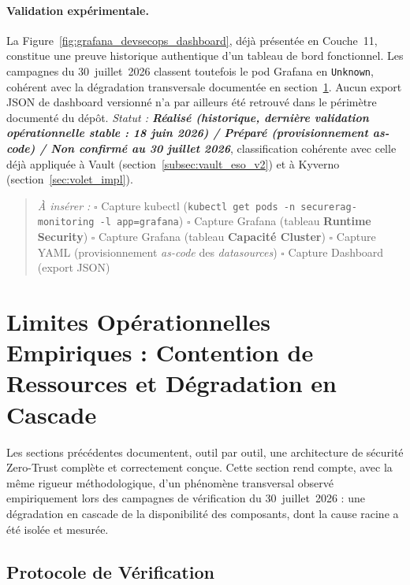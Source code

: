 \paragraph{Validation expérimentale.}
La Figure~\ref{fig:grafana_devsecops_dashboard}, déjà présentée en Couche~11, constitue une preuve historique authentique d'un tableau de bord fonctionnel. Les campagnes du 30~juillet~2026 classent toutefois le pod Grafana en \texttt{Unknown}, cohérent avec la dégradation transversale documentée en section~\ref{sec:limites_operationnelles_empiriques}. Aucun export JSON de dashboard versionné n'a par ailleurs été retrouvé dans le périmètre documenté du dépôt. \textit{Statut : \textbf{Réalisé (historique, dernière validation opérationnelle stable : 18 juin 2026) / Préparé (provisionnement as-code) / Non confirmé au 30 juillet 2026}}, classification cohérente avec celle déjà appliquée à Vault (section~\ref{subsec:vault_eso_v2}) et à Kyverno (section~\ref{sec:volet_impl}).

\begin{quote}
\scriptsize
\textit{À insérer :} \quad
$\square$ Capture kubectl (\texttt{kubectl get pods -n securerag-monitoring -l app=grafana}) \quad
$\square$ Capture Grafana (tableau \textbf{Runtime Security}) \quad
$\square$ Capture Grafana (tableau \textbf{Capacité Cluster}) \quad
$\square$ Capture YAML (provisionnement \textit{as-code} des \textit{datasources}) \quad
$\square$ Capture Dashboard (export JSON)
\end{quote}

\section{Limites Opérationnelles Empiriques : Contention de Ressources et Dégradation en Cascade}
\label{sec:limites_operationnelles_empiriques}

Les sections précédentes documentent, outil par outil, une architecture de sécurité Zero-Trust complète et correctement conçue. Cette section rend compte, avec la même rigueur méthodologique, d'un phénomène transversal observé empiriquement lors des campagnes de vérification du 30~juillet~2026 : une dégradation en cascade de la disponibilité des composants, dont la cause racine a été isolée et mesurée.

\subsection{Protocole de Vérification}

